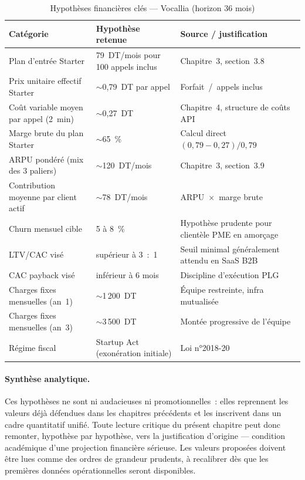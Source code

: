 \begin{table}[H]
\centering
\caption{Hypothèses financières clés — Vocallia (horizon 36 mois)}
\label{tab:hypotheses_financieres}
\begin{tabular}{|p{4.5cm}|p{5cm}|p{5cm}|}
\hline
\textbf{Catégorie} & \textbf{Hypothèse retenue} & \textbf{Source / justification} \\
\hline
Plan d'entrée Starter & 79~DT/mois pour 100 appels inclus & Chapitre~3, section~3.8 \\
\hline
Prix unitaire effectif Starter & $\sim$0{,}79~DT par appel & Forfait~/~appels inclus \\
\hline
Coût variable moyen par appel (2~min) & $\sim$0{,}27~DT & Chapitre~4, structure de coûts API \\
\hline
Marge brute du plan Starter & $\sim$65~\% & Calcul direct $(0{,}79 - 0{,}27)/0{,}79$ \\
\hline
ARPU pondéré (mix des 3 paliers) & $\sim$120~DT/mois & Chapitre~3, section~3.9 \\
\hline
Contribution moyenne par client actif & $\sim$78~DT/mois & ARPU~$\times$~marge brute \\
\hline
Churn mensuel cible & 5 à 8~\% & Hypothèse prudente pour clientèle PME en amorçage \\
\hline
LTV/CAC visé & supérieur à 3~:~1 & Seuil minimal généralement attendu en SaaS B2B \\
\hline
CAC payback visé & inférieur à 6 mois & Discipline d'exécution PLG \\
\hline
Charges fixes mensuelles (an~1) & $\sim$1\,200~DT & Équipe restreinte, infra mutualisée \\
\hline
Charges fixes mensuelles (an~3) & $\sim$3\,500~DT & Montée progressive de l'équipe \\
\hline
Régime fiscal & Startup Act (exonération initiale) & Loi n°2018-20 \\
\hline
\end{tabular}
\end{table}

\paragraph{Synthèse analytique.} Ces hypothèses ne sont ni audacieuses ni promotionnelles~: elles reprennent les valeurs déjà défendues dans les chapitres précédents et les inscrivent dans un cadre quantitatif unifié. Toute lecture critique du présent chapitre peut donc remonter, hypothèse par hypothèse, vers la justification d'origine — condition académique d'une projection financière sérieuse. Les valeurs proposées doivent être lues comme des ordres de grandeur prudents, à recalibrer dès que les premières données opérationnelles seront disponibles.

